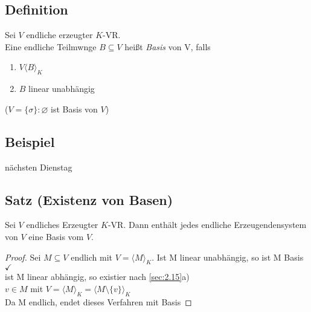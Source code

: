 \subsection{Definition}
Sei $V$ endliche erzeugter $K$-VR.\\
Eine endliche Teilmwnge $B \subseteq V$ heißt \emph{Basis} von V, falls
\begin{enumerate}[(1)]
\item $V \langle B \rangle_K$
\item $B$ linear unabhängig
\end{enumerate}
($V = \{ \sigma \}: \varnothing$ ist Basis von $V$)
\subsection{Beispiel}
nächsten Dienstag
\subsection{Satz (Existenz von Basen)}
Sei $V$ endliches Erzeugter $K$-VR. Dann enthält jedes endliche Erzeugendensystem von $V$ eine Basis vom $V$.
\begin{proof}
Sei $M \subseteq V$ endlich mit $V = \langle M \rangle_K$.
Ist M linear unabhängig, so ist M Basis $\checkmark$\\
ist M linear abhängig, so existier nach \ref{sec:2.15}a)\\
$v \in M$ mit $V = \langle M \rangle_K = \langle M \setminus \{v\} \rangle_K$\\
Da M endlich, endet dieses Verfahren mit Basis
\end{proof}
\printindex

